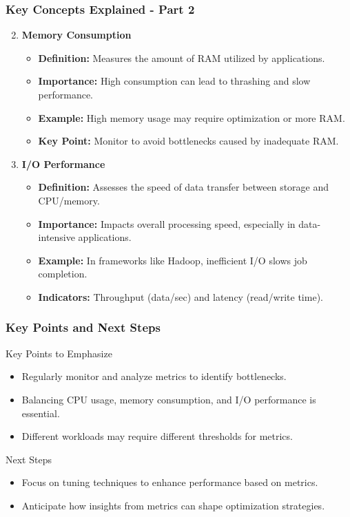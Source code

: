 \documentclass[aspectratio=169]{beamer}
\begin{document}
\begin{frame}[fragile]
    \frametitle{Key Concepts Explained - Part 2}
    \begin{enumerate}
        \setcounter{enumi}{1} %
        \item \textbf{Memory Consumption}
        \begin{itemize}
            \item \textbf{Definition:} Measures the amount of RAM utilized by applications.
            \item \textbf{Importance:} High consumption can lead to thrashing and slow performance.
            \item \textbf{Example:} High memory usage may require optimization or more RAM.
            \item \textbf{Key Point:} Monitor to avoid bottlenecks caused by inadequate RAM.
        \end{itemize}
        
        \item \textbf{I/O Performance}
        \begin{itemize}
            \item \textbf{Definition:} Assesses the speed of data transfer between storage and CPU/memory.
            \item \textbf{Importance:} Impacts overall processing speed, especially in data-intensive applications.
            \item \textbf{Example:} In frameworks like Hadoop, inefficient I/O slows job completion.
            \item \textbf{Indicators:} Throughput (data/sec) and latency (read/write time).
        \end{itemize}
    \end{enumerate}
\end{frame}

\begin{frame}[fragile]
    \frametitle{Key Points and Next Steps}
    \begin{block}{Key Points to Emphasize}
        \begin{itemize}
            \item Regularly monitor and analyze metrics to identify bottlenecks.
            \item Balancing CPU usage, memory consumption, and I/O performance is essential.
            \item Different workloads may require different thresholds for metrics.
        \end{itemize}
    \end{block}
    
    \begin{block}{Next Steps}
        \begin{itemize}
            \item Focus on tuning techniques to enhance performance based on metrics.
            \item Anticipate how insights from metrics can shape optimization strategies.
        \end{itemize}
    \end{block}
\end{frame}
\end{document}

